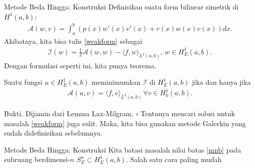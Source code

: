 \documentclass[xcolor={dvipsnames}, 9pt]{beamer}
\begin{document}
    \begin{frame}{Metode Beda Hingga: Konstruksi}
       Definisikan suatu form bilinear simetrik di $H^1(a,b)$:
       \begin{align*}
           \mathcal{A}(w,v) = \int_a^b (p(x)w'(x)v'(x)+r(x)w(x)v(x)) dx.
       \end{align*}
       Akibatnya, kita bisa tulis \eqref{weakform} sebagai
       \begin{align}\label{weakform2}
           \mathcal{I}(w) = \frac{1}{2}\mathcal{A}(w,w) - \langle f,w\rangle_{L^2(a,b)}, \, w\in H^1_E(a,b).
       \end{align}
       Dengan formulasi seperti ini, kita punya teorema.
       \begin{theorem}
           Suatu fungsi $u\in H^1_E(a,b)$ meminimumkan $\mathcal{I}$ di $H^1_E(a,b)$ jika dan hanya jika
           \begin{align}\label{galerkin}
               \mathcal{A}(u,v) = \langle f,v\rangle_{L^2(a,b)} \, \forall v\in H^1_0(a,b).
           \end{align}
       \end{theorem}
       Bukti. Dijamin dari Lemma Lax-Milgram. $\square$ \newline
       Tentunya mencari solusi untuk masalah \eqref{weakform} juga sulit. Maka, kita bisa gunakan metode Galerkin yang sudah didefinisikan sebelumnya.
    \end{frame}
    \begin{frame}{Metode Beda Hingga: Konstruksi}
        Kita batasi masalah nilai batas \eqref{mnb} pada subruang berdimensi-$n$ $S_E^n\subset H_E^1(a,b)$. Salah satu cara paling mudah 
    \end{frame}
\end{document}
